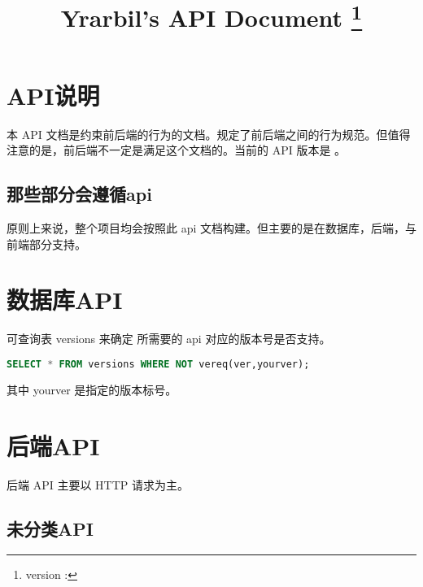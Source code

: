\documentclass[UTF8]{ctexart}
\title{Yrarbil's API Document \thanks{version : \apiver}}
\begin{document}
    \maketitle
    \newpage
    
    \tableofcontents
    \newpage
    \section{API说明}
    本 API 文档是约束前后端的行为的文档。规定了前后端之间的行为规范。但值得注意的是，前后端不一定是满足这个文档的。当前的 API 版本是 \apiver 。
    \subsection{那些部分会遵循api}
    原则上来说，整个项目均会按照此 api 文档构建。但主要的是在数据库，后端，与前端部分支持。
    
    
    
    
    
    
    
    
    
    
    
    \section{数据库API}
    可查询表 versions 来确定 所需要的 api 对应的版本号是否支持。
    \begin{lstlisting}[language=SQL]
SELECT * FROM versions WHERE NOT vereq(ver,yourver);
    \end{lstlisting}
    其中 yourver 是指定的版本标号。
    
    
    
    
    
    
    
    
    
    
    
    
    
    
    
    
    
    
    
    \section{后端API}
    后端 API 主要以 HTTP 请求为主。
    
    
    \subsection{未分类API}
    
\end{document}

